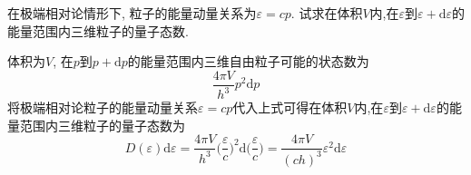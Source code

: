\begin{problem}[6.4]
在极端相对论情形下, 粒子的能量动量关系为$\varepsilon = cp$. 试求在体积$V$内,在$\varepsilon$到$\varepsilon+\mathrm{d}\varepsilon$的能量范围内三维粒子的量子态数.
\end{problem}
\begin{solution}
体积为$V$, 在$p$到$p+\mathrm{d}p$的能量范围内三维自由粒子可能的状态数为
\[
\frac{4\pi V}{h^3}p^2 \mathrm{d}p
\]
将极端相对论粒子的能量动量关系$\varepsilon = cp$代入上式可得在体积$V$内,在$\varepsilon$到$\varepsilon+\mathrm{d}\varepsilon$的能量范围内三维粒子的量子态数为
\[
D(\varepsilon) \mathrm{d}\varepsilon = \frac{4\pi V}{h^3}
\bigg(\frac{\varepsilon}{c}\bigg)^2 \mathrm{d}\bigg(\frac{\varepsilon}{c}\bigg)
= \frac{4\pi V}{(ch)^3} \varepsilon^2 \mathrm{d}\varepsilon
\]
\end{solution}
